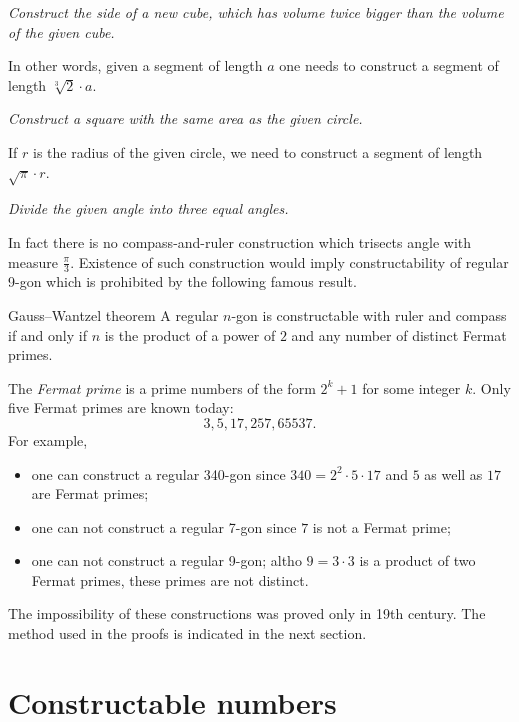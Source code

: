  {\it Construct the side of a new cube, 
which has volume twice bigger than the volume of the given cube.} 

\medskip

In other words, 
given a segment of length $a$
one needs to construct a segment of length $\sqrt[3]{2}\cdot a$.

 {\it Construct a square with the same area as the given circle.} 

\medskip

If $r$ is the radius of the given circle, we need to construct a segment of length $\sqrt{\pi}\cdot r$. 

{\it Divide the given angle into three equal angles.}

\medskip

In fact there is no compass-and-ruler construction which trisects angle with measure $\tfrac\pi3$. 
Existence of such construction would imply constructability of regular 9-gon which is prohibited by the following famous result.

\begin{thm}{Gauss--Wantzel theorem}
A regular $n$-gon is constructable with ruler and compass 
if and only if 
$n$ is the product of a power of $2$ and any number of distinct Fermat primes.
\end{thm}

The \emph{Fermat prime} is a prime numbers of the form $2^k+1$ for some integer $k$.
Only five Fermat primes are known  today:
$$3, 5, 17, 257, 65537.$$
For example, 
\begin{itemize}
\item one can construct a regular 340-gon since $340=2^2\cdot 5\cdot 17$ and $5$ as well as $17$ are Fermat primes;
\item one can not construct a regular 7-gon since $7$ is not a Fermat prime;
\item one can not construct a regular 9-gon; 
altho $9=3\cdot 3$ is a product of two Fermat primes, 
these primes are not distinct.
\end{itemize}

\medskip

The impossibility of these constructions 
was proved only in 19th century.
The method used in the proofs is indicated in the next section.

\section*{Constructable numbers}

